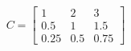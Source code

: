 \documentclass[preview]{standalone}
\begin{document}
\begin{align*}
C = \begin{bmatrix} 1 & 2 & 3 \\ 0.5 & 1 & 1.5 \\ 0.25 & 0.5 & 0.75 \end{bmatrix}
\end{align*}
\end{document}

